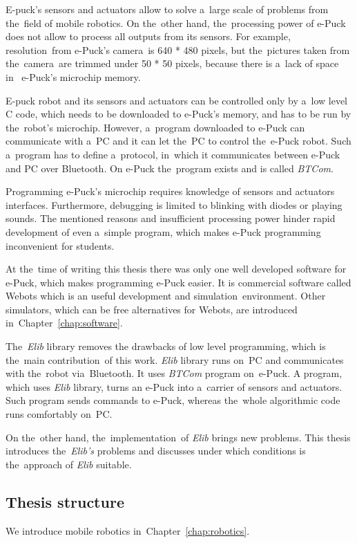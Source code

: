   E-puck's sensors and actuators allow to solve a~large scale of problems from the~field of mobile robotics. 
  On the~other hand, the~processing power of e-Puck does not allow to 
  process all outputs from its sensors. For example, resolution~from e-Puck's camera~is 640 * 480 pixels,
  but the~pictures taken from the~camera~are trimmed under 50 * 50 pixels, because there is a~lack of space in~
   e-Puck's microchip memory.
   
   E-puck robot and its sensors and actuators can be controlled only by a~low level C code,
   which needs to be downloaded to e-Puck's memory, and has to be run by the~robot's microchip.
   However, a~program downloaded to e-Puck can communicate with
   a~PC and it can let the~PC to control the~e-Puck robot. 
   Such a~program has to define a~protocol, 
   in~which it communicates between e-Puck and PC over Bluetooth.
  On e-Puck the~program exists and is called {\it BTCom}. 

  Programming e-Puck's microchip requires knowledge of sensors and actuators interfaces.
  Furthermore, debugging is limited to blinking with diodes or playing sounds.
  The mentioned reasons and insufficient processing power hinder rapid development 
  of even a~simple program, 
  which makes e-Puck programming inconvenient for students.
  
  At the~time of writing this thesis there was only one well developed software for e-Puck, which makes programming e-Puck easier.  It is commercial software called Webots which
   is an useful development and simulation~environment.
  Other simulators, which can be free alternatives for Webots, are introduced in~Chapter~\ref{chap:software}.
  
  The~{\it Elib} library removes the drawbacks of low level programming, 
  which is the~main contribution~of this work.
  {\it Elib} library runs on~PC and communicates with the~robot via~Bluetooth. 
  It uses {\it BTCom} program on~e-Puck.
  A program, which uses {\it Elib} library, 
  turns an e-Puck into a~carrier of sensors and actuators. 
  Such program sends commands to e-Puck,
  whereas the~whole algorithmic code runs comfortably on~PC.
  
  On the~other hand, the~implementation~of {\it Elib} brings new problems.
  This thesis introduces the~{\it Elib's} problems and discusses 
  under which conditions is the~approach of {\it Elib} suitable.	
  \subsection*{Thesis structure}
  We introduce mobile robotics in~Chapter~\ref{chap:robotics}.

